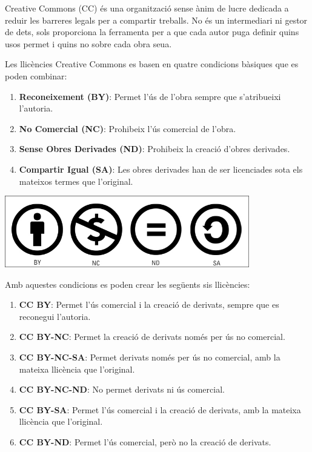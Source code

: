 \documentclass[
  12 pt,
  a4paper,
]{article}
\providecommand{\tightlist}{%
  \setlength{\itemsep}{0pt}\setlength{\parskip}{0pt}}
\begin{document}
Creative Commons (CC) és una organització sense ànim de lucre dedicada a
reduir les barreres legals per a compartir treballs. No és un
intermediari ni gestor de dets, sols proporciona la ferramenta per a que
cada autor puga definir quins usos permet i quins no sobre cada obra
seua.

Les llicències Creative Commons es basen en quatre condicions bàsiques
que es poden combinar:

\begin{enumerate}
\def\labelenumi{\arabic{enumi}.}
\tightlist
\item
  \textbf{Reconeixement (BY)}: Permet l'ús de l'obra sempre que
  s'atribueixi l'autoria.
\item
  \textbf{No Comercial (NC)}: Prohibeix l'ús comercial de l'obra.
\item
  \textbf{Sense Obres Derivades (ND)}: Prohibeix la creació d'obres
  derivades.
\item
  \textbf{Compartir Igual (SA)}: Les obres derivades han de ser
  licenciades sota els mateixos termes que l'original.
\end{enumerate}

\includegraphics[width=0.8\textwidth,height=\textheight]{recursos/cc-icons.jpg}

Amb aquestes condicions es poden crear les següents sis llicències:

\begin{enumerate}
\def\labelenumi{\arabic{enumi}.}
\tightlist
\item
  \textbf{CC BY}: Permet l'ús comercial i la creació de derivats, sempre
  que es reconegui l'autoria.
\item
  \textbf{CC BY-NC}: Permet la creació de derivats només per ús no
  comercial.
\item
  \textbf{CC BY-NC-SA}: Permet derivats només per ús no comercial, amb
  la mateixa llicència que l'original.
\item
  \textbf{CC BY-NC-ND}: No permet derivats ni ús comercial.
\item
  \textbf{CC BY-SA}: Permet l'ús comercial i la creació de derivats, amb
  la mateixa llicència que l'original.
\item
  \textbf{CC BY-ND}: Permet l'ús comercial, però no la creació de
  derivats.
\end{enumerate}
\end{document}
